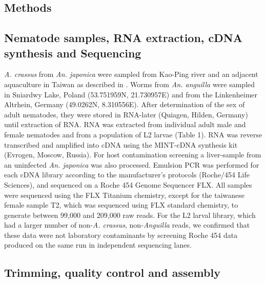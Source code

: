 \documentclass[10pt]{bmc_article}
\newenvironment{bmcformat}{\begin{raggedright}\baselineskip20pt\sloppy\setboolean{publ}{false}}{\end{raggedright}\baselineskip20pt\sloppy}
\begin{document}
\begin{bmcformat}
\section*{Methods}


\subsection*{Nematode samples, RNA extraction, cDNA synthesis and Sequencing}

\textit{A. crassus} from \textit{An. japonica} were sampled from
Kao-Ping river and an adjacent aquaculture in Taiwan as described in
\cite{heitlinger_massive_2009}. Worms from \textit{An. anguilla} were sampled
in Sniardwy Lake, Poland (53.751959N, 21.730957E) and from the
Linkenheimer Altrhein, Germany (49.0262N, 8.310556E). After
determination of the sex of adult nematodes, they were stored in
RNA-later (Quiagen, Hilden, Germany) until extraction of RNA. RNA was
extracted from individual adult male and female nematodes and from a
population of L2 larvae (Table 1). RNA was reverse transcribed and
amplified into cDNA using the MINT-cDNA synthesis kit (Evrogen,
Moscow, Russia).  For host contamination screening a liver-sample from
an uninfected \textit{An. japonica} was also processed.  Emulsion PCR
was performed for each cDNA library according to the manufacturer’s
protocols (Roche/454 Life Sciences), and sequenced on a Roche 454
Genome Sequencer FLX. All samples were sequenced using the FLX
Titanium chemistry, except for the taiwanese female sample T2, which
was sequenced using FLX standard chemistry, to generate between 99,000
and 209,000 raw reads. For the L2 larval library, which had a larger
number of non-\textit{A. crassus}, non-\textit{Anguilla} reads, we
confirmed that these data were not laboratory contaminants by
screening Roche 454 data produced on the same run in independent
sequencing lanes.


\subsection*{Trimming, quality control and assembly}


\end{bmcformat}
\end{document}
